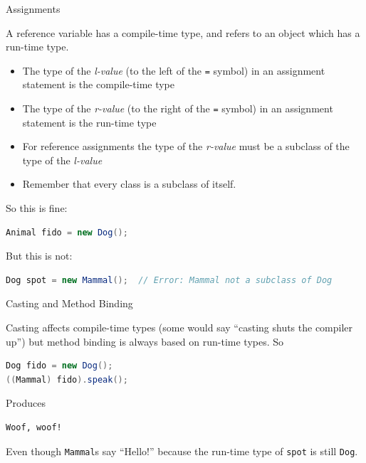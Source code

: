 \documentclass{beamer}
\begin{document}
\begin{frame}[fragile]{Assignments}


A reference variable has a compile-time type, and refers to an object which has a run-time type.
\begin{itemize}
\item The type of the {\it l-value} (to the left of the {\tt =} symbol) in an assignment statement is the compile-time type
\item The type of the {\it r-value} (to the right of the {\tt =} symbol) in an assignment statement is the run-time type
\item For reference assignments the type of the {\it r-value} must be a subclass of the type of the {\it l-value}
\item Remember that every class is a subclass of itself.
\end{itemize}

So this is fine:
\begin{lstlisting}[language=Java]
Animal fido = new Dog();
\end{lstlisting}
But this is not:
\begin{lstlisting}[language=Java]
Dog spot = new Mammal();  // Error: Mammal not a subclass of Dog
\end{lstlisting}


\end{frame}

\begin{frame}[fragile]{Casting and Method Binding}


Casting affects compile-time types (some would say ``casting shuts the compiler up'') but method binding is always based on run-time types.  So
\begin{lstlisting}[language=Java]
Dog fido = new Dog();
((Mammal) fido).speak();
\end{lstlisting}
Produces
\begin{lstlisting}[language=bash]
Woof, woof!
\end{lstlisting}
Even though {\tt Mammal}s say ``Hello!'' because the run-time type of {\tt spot} is still {\tt Dog}.

\end{frame}
\end{document}
